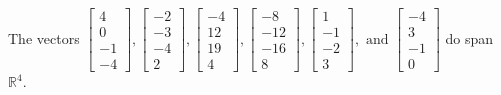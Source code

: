 \begin{exercise}
\begin{exerciseStatement}
  \end{exerciseStatement}
  \begin{exerciseAnswer}
   The vectors \(\left[\begin{array}{r}
4 \\
0 \\
-1 \\
-4
\end{array}\right] , \left[\begin{array}{r}
-2 \\
-3 \\
-4 \\
2
\end{array}\right] , \left[\begin{array}{r}
-4 \\
12 \\
19 \\
4
\end{array}\right] , \left[\begin{array}{r}
-8 \\
-12 \\
-16 \\
8
\end{array}\right] , \left[\begin{array}{r}
1 \\
-1 \\
-2 \\
3
\end{array}\right] , \text{ and } \left[\begin{array}{r}
-4 \\
3 \\
-1 \\
0
\end{array}\right]\) 
  	 do  
	span \(\mathbb{R}^4\).
  


  \end{exerciseAnswer}
\end{exercise}